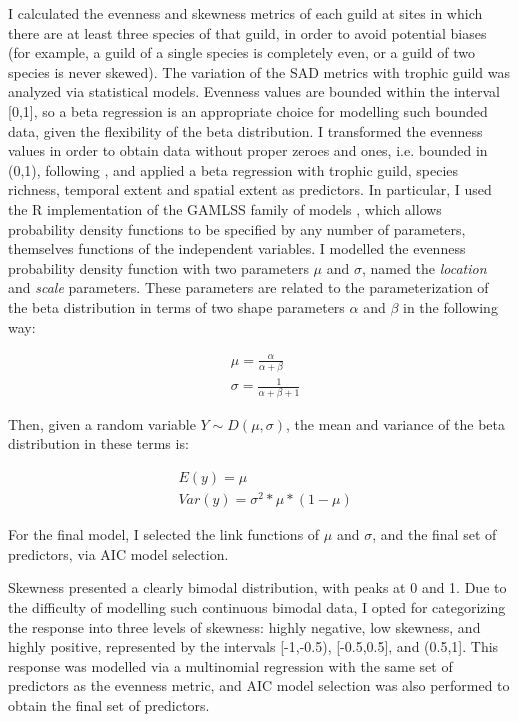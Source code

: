 I calculated the evenness and skewness metrics of each guild at sites in which there are at least three species of that guild, in order to avoid potential biases (for example, a guild of a single species is completely even, or a guild of two species is never skewed). The variation of the SAD metrics with trophic guild was analyzed via statistical models. Evenness values are bounded within the interval [0,1], so a beta regression is an appropriate choice for modelling such bounded data, given the flexibility of the beta distribution. I transformed the evenness values in order to obtain data without proper zeroes and ones, i.e. bounded in (0,1), following \cite{Smithson2006}, and applied a beta regression with trophic guild, species richness, temporal extent and spatial extent as predictors. In particular, I used the R implementation of the GAMLSS family of models \citep{Rigby2005}, which allows probability density functions to be specified by any number of parameters, themselves functions of the independent variables. I modelled the evenness probability density function with two parameters $\mu$ and $\sigma$, named the \textit{location} and \textit{scale} parameters. These parameters are related to the parameterization of the beta distribution in terms of two shape parameters $\alpha$ and $\beta$ in the following way:

\begin{align}%
& \mu = \frac{\alpha}{\alpha + \beta} \\
& \sigma = \frac{1}{\alpha + \beta + 1}
\end{align}

Then, given a random variable $Y \sim D(\mu,\sigma)$, the mean and variance of the beta distribution in these terms is:

\begin{align}\label{eq:eq4.4}
& E(y) = \mu \\
& Var(y) = \sigma^2 * \mu * (1-\mu)
\end{align}

For the final model, I selected the link functions of $\mu$ and $\sigma$, and the final set of predictors, via AIC model selection.

Skewness presented a clearly bimodal distribution, with peaks at 0 and 1. Due to the difficulty of modelling such continuous bimodal data, I opted for categorizing the response into three levels of skewness: highly negative, low skewness, and highly positive, represented by the intervals [-1,-0.5), [-0.5,0.5], and (0.5,1]. This response was modelled via a multinomial regression with the same set of predictors as the evenness metric, and AIC model selection was also performed to obtain the final set of predictors.

